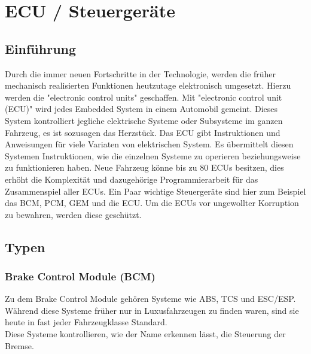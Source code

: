 \section{ECU / Steuergeräte}
    \subsection{Einführung}
    Durch die immer neuen Fortschritte in der Technologie, werden die früher mechanisch realisierten
    Funktionen heutzutage elektronisch umgesetzt. Hierzu werden die "electronic control units"
    geschaffen. Mit "electronic control unit (ECU)" wird jedes Embedded System in einem
    Automobil gemeint. Dieses System kontrolliert jegliche elektrische Systeme
    oder Subsysteme im ganzen Fahrzeug, es ist sozusagen das Herzstück. Das ECU gibt
    Instruktionen und Anweisungen für viele Variaten von elektrischen System. Es übermittelt
    diesen Systemen Instruktionen, wie die einzelnen Systeme zu operieren beziehungsweise
    zu funktionieren haben. Neue Fahrzeug könne bis zu 80 ECUs besitzen, dies erhöht die
    Komplexität und dazugehörige Programmierarbeit für das Zusammenspiel aller ECUs. Ein
    Paar wichtige Steuergeräte sind hier zum Beispiel das BCM, PCM, GEM und die ECU.
    Um die ECUs vor ungewollter Korruption zu bewahren, werden diese geschützt. 
    ~\cite{ECU.PB6} ~\cite{ECU.PB5} ~\cite{ECU.PB4} ~\cite{ECU.PB3} ~\cite{ECU.PB2} ~\cite{ECU.PB1}

    \subsection{Typen}
        \subsubsection{Brake Control Module (BCM)}
        Zu dem Brake Control Module gehören Systeme wie ABS, TCS und ESC/ESP. Während diese Systeme früher
        nur in Luxusfahrzeugen zu finden waren, sind sie heute in fast jeder Fahrzeugklasse Standard.\\
        Diese Systeme kontrollieren, wie der Name erkennen lässt, die Steuerung der Bremse.

